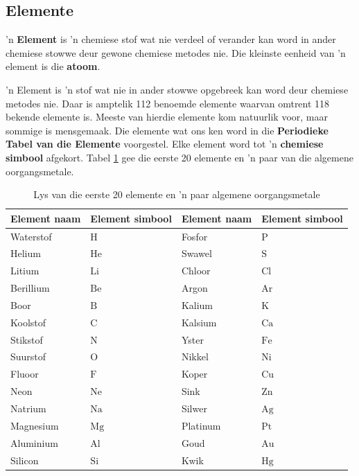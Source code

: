             \subsection*{Elemente}
            \nopagebreak
        \label{m38708*id63302}'n \textbf{Element} is 'n chemiese stof wat nie verdeel of verander kan word in ander chemiese stowwe deur gewone chemiese metodes nie. Die kleinste eenheid van 'n element is die \textbf{atoom}.\par 
\label{m38708*fhsst!!!underscore!!!id193}
{ \label{m38708*meaningfhsst!!!underscore!!!id193}
'n Element is 'n stof wat nie in ander stowwe opgebreek kan word deur chemiese metodes nie.} 
        \label{m38708*id63334}Daar is amptelik 112 benoemde elemente waarvan omtrent 118 bekende elemente is. Meeste van hierdie elemente kom natuurlik voor, maar sommige is mensgemaak. Die elemente wat ons ken word in die \textbf{Periodieke Tabel van die Elemente} voorgestel. Elke element word tot 'n \textbf{chemiese simbool} afgekort. Tabel \ref{tab:elements} gee die eerste 20 elemente en 'n paar van die algemene oorgangsmetale.\par \label{m38708*eip-775}
\begin{table}[h!]
\label{tab:elements}
\begin{center}
\begin{tabular}{|l|l|l|l|}\hline
\textbf{Element naam} & \textbf{Element simbool} & \textbf{Element naam} & \textbf{Element simbool} \\ \hline
Waterstof & $\text{H}$ & Fosfor & $\text{P}$  \\ \hline
Helium & $\text{He}$ & Swawel & $\text{S}$ \\ \hline
Litium & $\text{Li}$ & Chloor & $\text{Cl}$ \\ \hline
Berillium & $\text{Be}$ & Argon & $\text{Ar}$ \\ \hline 
Boor & $\text{B}$ & Kalium & $\text{K}$ \\ \hline
Koolstof & $\text{C}$ & Kalsium & $\text{Ca}$ \\ \hline 
Stikstof & $\text{N}$ & Yster & $\text{Fe}$ \\ \hline
Suurstof & $\text{O}$ & Nikkel & $\text{Ni}$ \\ \hline 
Fluoor & $\text{F}$ & Koper & $\text{Cu}$ \\ \hline
Neon & $\text{Ne}$  & Sink & $\text{Zn}$ \\ \hline
Natrium & $\text{Na}$  & Silwer & $\text{Ag}$ \\ \hline
Magnesium & $\text{Mg}$  & Platinum & $\text{Pt}$ \\ \hline
Aluminium & $\text{Al}$ & Goud & $\text{Au}$ \\ \hline
Silicon & $\text{Si}$ & Kwik & $\text{Hg}$  \\ \hline
\end{tabular}
\end{center}
\caption{Lys van die eerste 20 elemente en 'n paar algemene oorgangsmetale}
\end{table}
